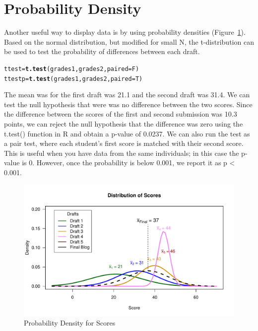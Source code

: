 \documentclass{article}\usepackage[]{graphicx}\usepackage[]{color}
\makeatletter
\def\maxwidth{ %
  \ifdim\Gin@nat@width>\linewidth
    \linewidth
  \else
    \Gin@nat@width
  \fi
}
\newcommand{\hlstd}[1]{\textcolor[rgb]{0.345,0.345,0.345}{#1}}%
\newcommand{\hlkwb}[1]{\textcolor[rgb]{0.69,0.353,0.396}{#1}}%
\newcommand{\hlkwc}[1]{\textcolor[rgb]{0.333,0.667,0.333}{#1}}%
\newcommand{\hlkwd}[1]{\textcolor[rgb]{0.737,0.353,0.396}{\textbf{#1}}}%
\newenvironment{kframe}{%
 \def\at@end@of@kframe{}%
 \ifinner\ifhmode%
  \def\at@end@of@kframe{\end{minipage}}%
  \begin{minipage}{\columnwidth}%
 \fi\fi%
 \def\FrameCommand##1{\hskip\@totalleftmargin \hskip-\fboxsep
 \colorbox{shadecolor}{##1}\hskip-\fboxsep
     \hskip-\linewidth \hskip-\@totalleftmargin \hskip\columnwidth}%
 \MakeFramed {\advance\hsize-\width
   \@totalleftmargin\z@ \linewidth\hsize
   \@setminipage}}%
 {\par\unskip\endMakeFramed%
 \at@end@of@kframe}
\newenvironment{knitrout}{}{} %
\makeatother
\begin{document}
\section{Probability Density}

Another useful way to display data is by using probability densities (Figure~\ref{fig:scoresdensity}). Based on the normal distribution, but modified for small N, the t-distribution can be used to test the probability of differences between each draft.

\begin{knitrout}
\color{fgcolor}\begin{kframe}
\begin{alltt}
\hlstd{ttest} \hlkwb{=} \hlkwd{t.test}\hlstd{(grades1, grades2,} \hlkwc{paired}\hlstd{=F)}
\hlstd{ttestp} \hlkwb{=} \hlkwd{t.test}\hlstd{(grades1, grades2,} \hlkwc{paired}\hlstd{=T)}
\end{alltt}
\end{kframe}
\end{knitrout}

The mean was for the first draft was 21.1 and the second draft was 31.4. We can test the null hypothesis that were was no difference between the two scores. Since the difference  between the scores of the first and second submission was 10.3 points, we can reject the null hypothesis that the difference was zero using the t.test() function in R and obtain a p-value of 0.0237. We can also run the test as a pair test, where each student's first score is matched with their second score. This is useful when you have data from the same individuals; in this case the p-value is 0. However, once the probability is below 0.001, we report it as p < 0.001. 

\begin{knitrout}
\color{fgcolor}\begin{figure}
\includegraphics[width=\maxwidth]{figure/scoresdensity-1} \caption[Probability Density for Scores]{Probability Density for Scores}\label{fig:scoresdensity}
\end{figure}


\end{knitrout}
\end{document}
